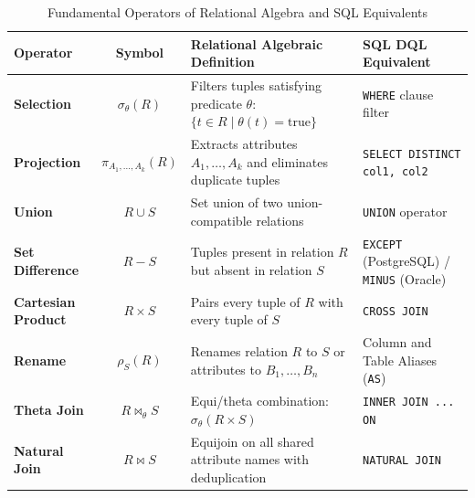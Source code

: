 \begin{table}[htbp]
\centering
\small
\caption{Fundamental Operators of Relational Algebra and SQL Equivalents}
\label{tab:relational_algebra_ops}
\begin{tabularx}{\textwidth}{l c p{5.5cm} X}
\toprule
\textbf{Operator} & \textbf{Symbol} & \textbf{Relational Algebraic Definition} & \textbf{SQL DQL Equivalent} \\
\midrule
\textbf{Selection} & $\sigma_{\theta}(R)$ & Filters tuples satisfying predicate $\theta$: $\{t \in R \mid \theta(t) = \text{true}\}$ & \texttt{WHERE} clause filter \\
\textbf{Projection} & $\pi_{A_1, \dots, A_k}(R)$ & Extracts attributes $A_1, \dots, A_k$ and eliminates duplicate tuples & \texttt{SELECT DISTINCT col1, col2} \\
\textbf{Union} & $R \cup S$ & Set union of two union-compatible relations & \texttt{UNION} operator \\
\textbf{Set Difference} & $R - S$ & Tuples present in relation $R$ but absent in relation $S$ & \texttt{EXCEPT} (PostgreSQL) / \texttt{MINUS} (Oracle) \\
\textbf{Cartesian Product} & $R \times S$ & Pairs every tuple of $R$ with every tuple of $S$ & \texttt{CROSS JOIN} \\
\textbf{Rename} & $\rho_{S}(R)$ & Renames relation $R$ to $S$ or attributes to $B_1, \dots, B_n$ & Column and Table Aliases (\texttt{AS}) \\
\textbf{Theta Join} & $R \bowtie_{\theta} S$ & Equi/theta combination: $\sigma_{\theta}(R \times S)$ & \texttt{INNER JOIN ... ON} \\
\textbf{Natural Join} & $R \bowtie S$ & Equijoin on all shared attribute names with deduplication & \texttt{NATURAL JOIN} \\
\bottomrule
\end{tabularx}
\end{table}

